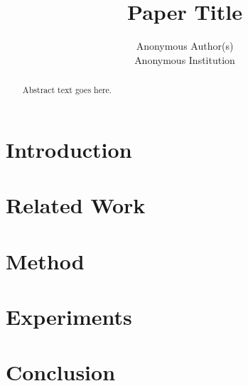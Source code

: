 \documentclass[letterpaper,twocolumn,10pt]{article}
\title{Paper Title}
\author{
  {\rm Anonymous Author(s)}\\
  Anonymous Institution
}
\begin{document}
\maketitle

\begin{abstract}
Abstract text goes here.
\end{abstract}

\section{Introduction}

\section{Related Work}

\section{Method}

\section{Experiments}

\section{Conclusion}

\clearpage


\end{document}
